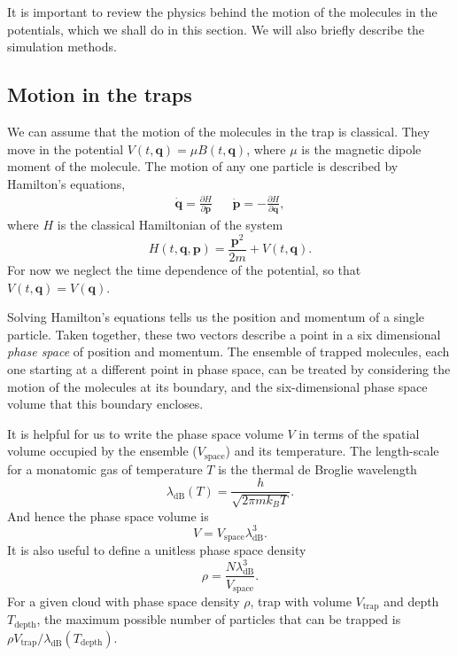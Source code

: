 It is important to review the physics behind the motion of the molecules in the
potentials, which we shall do in this section. We will also briefly describe
the simulation methods.

\subsection{Motion in the traps}
\label{desgin:motion}

We can assume that the motion of the molecules in the trap is classical. They
move in the potential $V(t, \mathbf{q}) = \mu B(t, \mathbf{q})$, where $\mu$ is
the magnetic dipole moment of the molecule.  The motion of any one particle is
described by Hamilton's equations,~\cite{Lichtenberg1969}
%
\begin{align}
  \label{design:eq:hamilton}
  \dot{\mathbf{q}} =  \frac{\partial H}{\partial \mathbf{p}} &&
  \dot{\mathbf{p}} = -\frac{\partial H}{\partial \mathbf{q}},
\end{align}
%
where $H$ is the classical Hamiltonian of the system
\begin{equation}
  H(t, \mathbf{q}, \mathbf{p}) = \frac{\mathbf{p}^2}{2m} + V(t, \mathbf{q}).
\end{equation}
For now we neglect the time dependence of the potential, so that $V(t,
\mathbf{q}) = V(\mathbf{q})$.

Solving Hamilton's equations tells us the position and momentum of a single
particle. Taken together, these two vectors describe a point in a six
dimensional \emph{phase space} of position and momentum. The ensemble of
trapped molecules, each one starting at a different point in phase space, can
be treated by considering the motion of the molecules at its
boundary, and the  six-dimensional phase space volume that this
boundary encloses.~\cite{Hand1998}

It is helpful for us to write the phase space volume $V$ in terms of the
spatial volume occupied by the ensemble ($V_\text{space}$) and its temperature.
The length-scale for a monatomic gas of temperature $T$ is the thermal de
Broglie wavelength~\cite{blundell2}
%
\begin{equation}
  \lambda_\text{dB}(T) = \frac{h}{\sqrt{2 \pi m k_B T}}.
\end{equation}
And hence the phase space volume is 
%
\begin{equation}
  V = V_\text{space} \lambda_\text{dB}^3.
\end{equation}
%
It is also useful to define a unitless phase space
density~\cite{PhysRevA.52.1423}
%
\begin{equation}
  \rho = \frac{N \lambda_\text{dB}^3}{V_\text{space}}.
\end{equation}
%
For a given cloud with phase space density $\rho$, trap with volume
$V_\text{trap}$ and depth $T_\text{depth}$,
the maximum possible number of particles that can be trapped is $\rho
V_\text{trap}/\lambda_\text{dB}(T_\text{depth})$.

